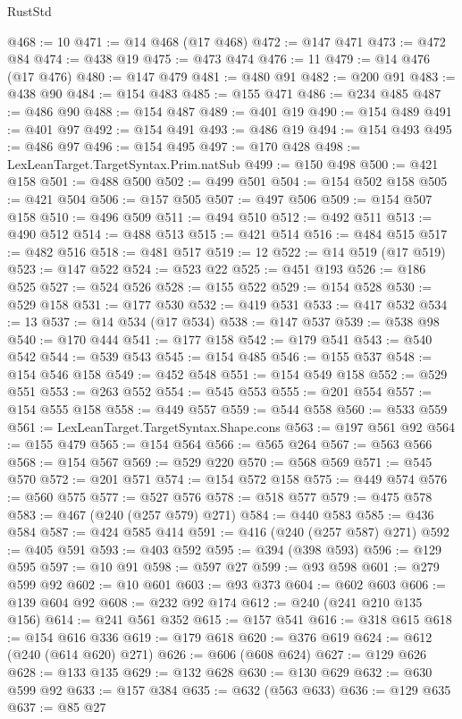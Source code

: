 \begin{lexlean}{RustStd}
\begin{coremodule}
{\begin{coremodule}
{{{{{{{{{{{{{{{{{{{{{{{{{{{{{{{{{{{{{{{@468 := 10
@471 := @14 @468 (@17 @468)
@472 := @147 @471
@473 := @472 @84
@474 := @438 @19
@475 := @473 @474
@476 := 11
@479 := @14 @476 (@17 @476)
@480 := @147 @479
@481 := @480 @91
@482 := @200 @91
@483 := @438 @90
@484 := @154 @483
@485 := @155 @471
@486 := @234 @485
@487 := @486 @90
@488 := @154 @487
@489 := @401 @19
@490 := @154 @489
@491 := @401 @97
@492 := @154 @491
@493 := @486 @19
@494 := @154 @493
@495 := @486 @97
@496 := @154 @495
@497 := @170 @428
@498 := LexLeanTarget.TargetSyntax.Prim.natSub
@499 := @150 @498
@500 := @421 @158
@501 := @488 @500
@502 := @499 @501
@504 := @154 @502 @158
@505 := @421 @504
@506 := @157 @505
@507 := @497 @506
@509 := @154 @507 @158
@510 := @496 @509
@511 := @494 @510
@512 := @492 @511
@513 := @490 @512
@514 := @488 @513
@515 := @421 @514
@516 := @484 @515
@517 := @482 @516
@518 := @481 @517
@519 := 12
@522 := @14 @519 (@17 @519)
@523 := @147 @522
@524 := @523 @22
@525 := @451 @193
@526 := @186 @525
@527 := @524 @526
@528 := @155 @522
@529 := @154 @528
@530 := @529 @158
@531 := @177 @530
@532 := @419 @531
@533 := @417 @532
@534 := 13
@537 := @14 @534 (@17 @534)
@538 := @147 @537
@539 := @538 @98
@540 := @170 @444
@541 := @177 @158
@542 := @179 @541
@543 := @540 @542
@544 := @539 @543
@545 := @154 @485
@546 := @155 @537
@548 := @154 @546 @158
@549 := @452 @548
@551 := @154 @549 @158
@552 := @529 @551
@553 := @263 @552
@554 := @545 @553
@555 := @201 @554
@557 := @154 @555 @158
@558 := @449 @557
@559 := @544 @558
@560 := @533 @559
@561 := LexLeanTarget.TargetSyntax.Shape.cons
@563 := @197 @561 @92
@564 := @155 @479
@565 := @154 @564
@566 := @565 @264
@567 := @563 @566
@568 := @154 @567
@569 := @529 @220
@570 := @568 @569
@571 := @545 @570
@572 := @201 @571
@574 := @154 @572 @158
@575 := @449 @574
@576 := @560 @575
@577 := @527 @576
@578 := @518 @577
@579 := @475 @578
@583 := @467 (@240 (@257 @579) @271)
@584 := @440 @583
@585 := @436 @584
@587 := @424 @585 @414
@591 := @416 (@240 (@257 @587) @271)
@592 := @405 @591
@593 := @403 @592
@595 := @394 (@398 @593)
@596 := @129 @595
@597 := @10 @91
@598 := @597 @27
@599 := @93 @598
@601 := @279 @599 @92
@602 := @10 @601
@603 := @93 @373
@604 := @602 @603
@606 := @139 @604 @92
@608 := @232 @92 @174
@612 := @240 (@241 @210 @135 @156)
@614 := @241 @561 @352
@615 := @157 @541
@616 := @318 @615
@618 := @154 @616 @336
@619 := @179 @618
@620 := @376 @619
@624 := @612 (@240 (@614 @620) @271)
@626 := @606 (@608 @624)
@627 := @129 @626
@628 := @133 @135
@629 := @132 @628
@630 := @130 @629
@632 := @630 @599 @92
@633 := @157 @384
@635 := @632 (@563 @633)
@636 := @129 @635
@637 := @85 @27
}}}}}}}}}}}}}}}}}}}}}}}}}}}}}}}}}}}}}}}
\end{coremodule}}
\end{coremodule}
\end{lexlean}
